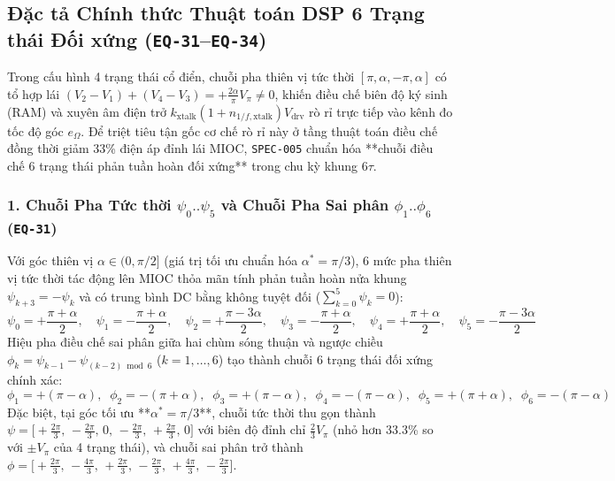 \documentclass[11pt, a4paper]{article}
\begin{document}
\subsection{Đặc tả Chính thức Thuật toán DSP 6 Trạng thái Đối xứng (\texttt{EQ-31}--\texttt{EQ-34})}

Trong cấu hình 4 trạng thái cổ điển, chuỗi pha thiên vị tức thời $[\pi, \alpha, -\pi, \alpha]$ có tổ hợp lái $(V_2 - V_1) + (V_4 - V_3) = +\frac{2\alpha}{\pi}V_\pi \ne 0$, khiến điều chế biên độ ký sinh (RAM) và xuyên âm điện trở $k_{\text{xtalk}}(1 + n_{1/f,\text{xtalk}})V_{\text{drv}}$ rò rỉ trực tiếp vào kênh đo tốc độ góc $e_\Omega$. Để triệt tiêu tận gốc cơ chế rò rỉ này ở tầng thuật toán điều chế đồng thời giảm 33\% điện áp đỉnh lái MIOC, \texttt{SPEC-005} chuẩn hóa **chuỗi điều chế 6 trạng thái phản tuần hoàn đối xứng** trong chu kỳ khung $6\tau$.

\subsubsection*{1. Chuỗi Pha Tức thời $\psi_0..\psi_5$ và Chuỗi Pha Sai phân $\phi_1..\phi_6$ (\texttt{EQ-31})}
Với góc thiên vị $\alpha \in (0, \pi/2]$ (giá trị tối ưu chuẩn hóa $\alpha^* = \pi/3$), 6 mức pha thiên vị tức thời tác động lên MIOC thỏa mãn tính phản tuần hoàn nửa khung $\psi_{k+3} = -\psi_k$ và có trung bình DC bằng không tuyệt đối ($\sum_{k=0}^{5}\psi_k = 0$):
\begin{equation}
\psi_0 = +\frac{\pi+\alpha}{2}, \quad
\psi_1 = -\frac{\pi+\alpha}{2}, \quad
\psi_2 = +\frac{\pi-3\alpha}{2}, \quad
\psi_3 = -\frac{\pi+\alpha}{2}, \quad
\psi_4 = +\frac{\pi+\alpha}{2}, \quad
\psi_5 = -\frac{\pi-3\alpha}{2}
\label{eq:eq31_psi}
\end{equation}
Hiệu pha điều chế sai phân giữa hai chùm sóng thuận và ngược chiều $\phi_k = \psi_{k-1} - \psi_{(k-2)\bmod 6}$ ($k = 1,\dots,6$) tạo thành chuỗi 6 trạng thái đối xứng chính xác:
\begin{equation}
\phi_1 = +(\pi-\alpha),\;\;
\phi_2 = -(\pi+\alpha),\;\;
\phi_3 = +(\pi-\alpha),\;\;
\phi_4 = -(\pi-\alpha),\;\;
\phi_5 = +(\pi+\alpha),\;\;
\phi_6 = -(\pi-\alpha)
\label{eq:eq31_phi}
\end{equation}
Đặc biệt, tại góc tối ưu **$\alpha^* = \pi/3$**, chuỗi tức thời thu gọn thành $\psi = \bigl[+\tfrac{2\pi}{3},\, -\tfrac{2\pi}{3},\, 0,\, -\tfrac{2\pi}{3},\, +\tfrac{2\pi}{3},\, 0\bigr]$ với biên độ đỉnh chỉ $\frac{2}{3}V_\pi$ (nhỏ hơn 33.3\% so với $\pm V_\pi$ của 4 trạng thái), và chuỗi sai phân trở thành $\phi = \bigl[+\tfrac{2\pi}{3},\, -\tfrac{4\pi}{3},\, +\tfrac{2\pi}{3},\, -\tfrac{2\pi}{3},\, +\tfrac{4\pi}{3},\, -\tfrac{2\pi}{3}\bigr]$.
\end{document}
